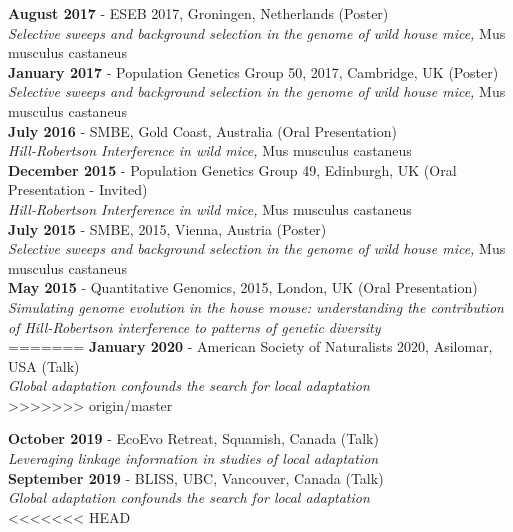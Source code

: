 \documentclass[11pt]{article}
\makeatletter
\newlength{\bibhang}
\newlength{\bibsep}
 {\@listi \global\bibsep\itemsep \global\advance\bibsep by\parsep}
\newenvironment{bibsection}%
        {\begin{etaremune}{}{%
       \setlength{\leftmargin}{\bibhang}%
       \setlength{\itemindent}{-\leftmargin}%
       \setlength{\itemsep}{\bibsep}%
       \setlength{\parsep}{\z@}%
        \setlength{\partopsep}{0pt}%
        \setlength{\topsep}{0pt}}}
        {\end{etaremune}\vspace{-.6\baselineskip}}
\newenvironment{innerlist}[1][\enskip\textbullet]%
        {\begin{itemize}[#1,leftmargin=*,parsep=0pt,itemsep=0pt,topsep=0pt,partopsep=0pt]}
        {\end{itemize}}
\makeatother
\begin{document}
\begin{bibsection}
\begin{innerlist}
{\bf August 2017} - ESEB 2017, Groningen, Netherlands (Poster) \\
\emph{Selective sweeps and background selection in the genome of wild house mice,} Mus musculus castaneus \\

{\bf January 2017} - Population Genetics Group 50, 2017, Cambridge, UK (Poster) \\
\emph{Selective sweeps and background selection in the genome of wild house mice,} Mus musculus castaneus \\

{\bf July 2016} - SMBE, Gold Coast, Australia (Oral Presentation) \\
\emph{Hill-Robertson Interference in wild mice,} Mus musculus castaneus\\

{\bf December 2015} - Population Genetics Group 49, Edinburgh, UK (Oral Presentation - Invited) \\
\emph{Hill-Robertson Interference in wild mice,} Mus musculus castaneus\\


{\bf July 2015} - SMBE, 2015, Vienna, Austria (Poster) \\
\emph{Selective sweeps and background selection in the genome of wild house mice,} Mus musculus castaneus \\

{\bf May 2015} - Quantitative Genomics, 2015, London, UK (Oral Presentation) \\
\emph{Simulating genome evolution in the house mouse: understanding the contribution of Hill-Robertson interference to patterns of genetic diversity} \\
=======
{\bf January 2020} - American Society of Naturalists 2020, Asilomar, USA (Talk) \\
\emph{Global adaptation confounds the search for local adaptation} \\
>>>>>>> origin/master

{\bf October 2019}  - EcoEvo Retreat, Squamish, Canada (Talk) \\
\emph{Leveraging linkage information in studies of local adaptation} \\

{\bf September 2019} - BLISS, UBC, Vancouver, Canada (Talk) \\
\emph{Global adaptation confounds the search for local adaptation} \\

<<<<<<< HEAD


\end{innerlist}
\end{bibsection}
\end{document}
